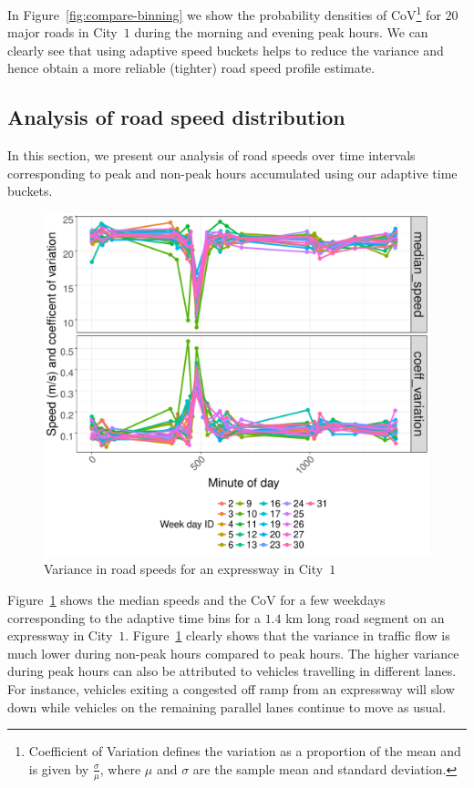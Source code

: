 \documentclass[conference]{IEEEtran}
\begin{document}
In Figure~\ref{fig:compare-binning} we show the probability densities of \ac{CoV}\footnote{Coefficient of Variation defines the variation as a proportion of the mean and is given by $\frac{\sigma}{\mu}$, where $\mu$ and $\sigma$ are the sample mean and standard deviation.} for $20$ major roads in City~$1$ during the morning and evening peak hours. We can clearly see that using adaptive speed buckets helps to reduce the variance and hence obtain a more reliable (tighter) road speed profile estimate.


\subsection{Analysis of road speed distribution}
In this section, we present our analysis of road speeds over time intervals corresponding to peak and non-peak hours accumulated using our adaptive time buckets.

\label{subsec:speed-disribution}
\begin{figure}[!tb]
	\centering
	\includegraphics[width=\columnwidth,left]{images/AyerRajah.pdf}
	
	\caption{Variance in road speeds for an expressway in City~$1$}
	\label{fig:ayerajah-distribution}
\end{figure}

Figure~\ref{fig:ayerajah-distribution} shows the median speeds and the \ac{CoV}  for a few weekdays corresponding to the adaptive time bins for a $1.4$ km long road segment on an expressway in City~$1$. Figure~\ref{fig:ayerajah-distribution} clearly shows that the variance in traffic flow is much lower during non-peak hours compared to peak hours. The higher variance during peak hours can also be attributed to vehicles travelling in different lanes. For instance, vehicles exiting a congested off ramp from an expressway will slow down while vehicles on the remaining parallel lanes continue to move as usual.
\end{document}

